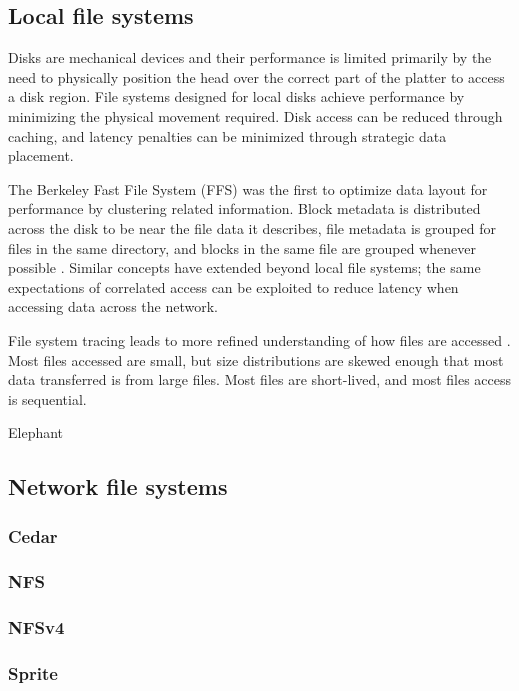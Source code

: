 \subsection{Local file systems}

Disks are mechanical devices and their performance is limited primarily by the need to physically position the head over the correct part of the platter to access a disk region. File systems designed for local disks achieve performance by minimizing the physical movement required. Disk access can be reduced through caching, and latency penalties can be minimized through strategic data placement.

The Berkeley Fast File System (FFS) was the first to optimize data layout for performance by clustering related information. Block metadata is distributed across the disk to be near the file data it describes, file metadata is grouped for files in the same directory, and blocks in the same file are grouped whenever possible \cite{mckusick}. Similar concepts have extended beyond local file systems; the same expectations of correlated access can be exploited to reduce latency when accessing data across the network.

File system tracing leads to more refined understanding of how files are accessed \cite{ousterhout,ruemmler,gibson98b}. Most files accessed are small, but size distributions are skewed enough that most data transferred is from large files. Most files are short-lived, and most files access is sequential. 

Elephant
\cite{santry}

\subsection{Network file systems}
\subsubsection{Cedar}
\cite{gifford,hagmann}
\subsubsection{NFS}
\cite{sandberg,pawlowski,callaghan}
\subsubsection{NFSv4}
\subsubsection{Sprite}
\cite{baker91,nelson,welch}
